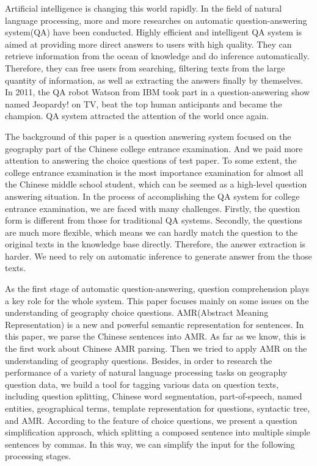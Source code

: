 \documentclass[master, winfont]{njuthesis}
\begin{document}
\begin{englishabstract}
Artificial intelligence is changing this world rapidly. In the field of natural language processing, more and more researches on automatic question-answering system(QA) have been conducted. Highly efficient and intelligent QA system is aimed at providing more direct answers to users with high quality. They can retrieve information from the ocean of knowledge and do inference automatically. Therefore, they can free users from searching, filtering texts from the large quantity of information, as well as extracting the answers finally by themselves. In 2011, the QA robot Watson from IBM took part in a question-answering show named Jeopardy! on TV, beat the top human anticipants and became the champion. QA system attracted the attention of the world once again.

The background of this paper is a question answering system focused on the geography part of the Chinese college entrance examination. And we paid more attention to answering the choice questions of test paper. To some extent, the college entrance examination is the most importance examination for almost all the Chinese middle school student, which can be seemed as a high-level question answering situation. In the process of accomplishing the QA system for college entrance examination, we are faced with many challenges. Firstly, the question form is different from those for traditional QA systems. Secondly, the questions are much more flexible, which means we can hardly match the question to the original texts in the knowledge base directly. Therefore, the answer extraction is harder. We need to rely on automatic inference to generate answer from the those texts.

As the first stage of automatic question-answering, question comprehension plays a key role for the whole system. This paper focuses mainly on some issues on the understanding of geography choice questions. AMR(Abstract Meaning Representation) is a new and powerful semantic representation for sentences. In this paper, we parse the Chinese sentences into AMR. As far as we know, this is the first work about Chinese AMR parsing. Then we tried to apply AMR on the understanding of geography questions. Besides, in order to research the performance of a variety of natural language processing tasks on geography question data, we build a tool for tagging various data on question texts, including question splitting, Chinese word segmentation, part-of-speech, named entities, geographical terms, template representation for questions, syntactic tree, and AMR. According to the feature of choice questions, we present a question simplification approach, which splitting a composed sentence into multiple simple sentences by commas. In this way, we can simplify the input for the following processing stages.


\end{englishabstract}
\end{document}
